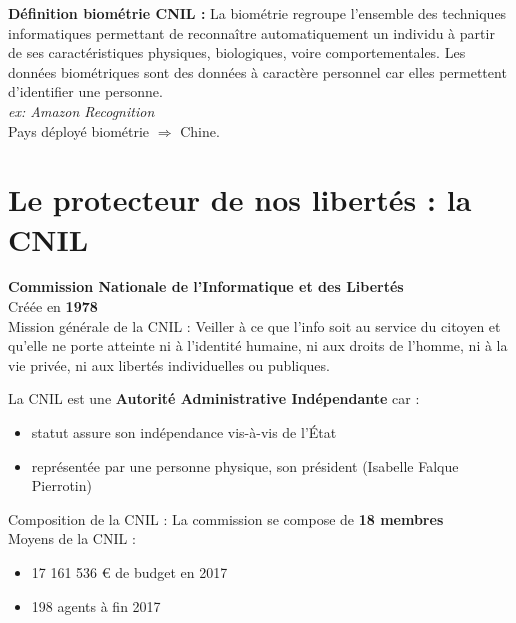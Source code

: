 \documentclass[a4paper,11pt]{report}
\begin{document}
\textbf{Définition biométrie CNIL :}
La biométrie regroupe l’ensemble des techniques informatiques permettant de reconnaître automatiquement un individu à partir de ses caractéristiques physiques, biologiques, voire comportementales.
Les données biométriques sont des données à caractère personnel car elles permettent d’identifier une personne. \\
\textit{ex: Amazon Recognition} \\
Pays déployé biométrie $\Rightarrow$ Chine.


\section{Le protecteur de nos libertés : la CNIL}

\textbf{Commission Nationale de l’Informatique et des Libertés} \\
Créée en \textbf{1978} \\
Mission générale de la CNIL :
Veiller à ce que l’info soit au service du citoyen et qu’elle ne porte atteinte ni à l’identité humaine, ni aux droits de l’homme, ni à la vie privée, ni aux libertés individuelles ou publiques.

La CNIL est une \textbf{Autorité Administrative Indépendante} car :
\begin{itemize}
    \item statut assure son indépendance vis-à-vis de l’État
    \item représentée par une personne physique, son président (Isabelle Falque Pierrotin) \\
\end{itemize}

Composition de la CNIL : 
La commission se compose de \textbf{18 membres}\\

Moyens de la CNIL :
\begin{itemize}
    \item 17 161 536 € de budget en 2017
    \item 198 agents à fin 2017\\
\end{itemize}
\end{document}
